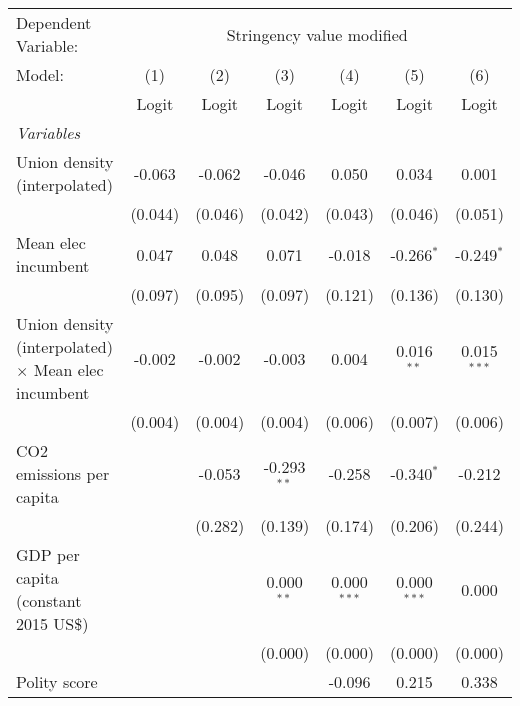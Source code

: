 
\begingroup
\centering
\begin{tabular}{lcccccc}
   \toprule
   Dependent Variable: & \multicolumn{6}{c}{Stringency value modified}\\
   Model:                                                     & (1)     & (2)     & (3)           & (4)           & (5)           & (6)\\  
                                                              &  Logit  & Logit   & Logit         & Logit         & Logit         & Logit\\  
   \midrule
   \emph{Variables}\\
   Union density (interpolated)                               & -0.063  & -0.062  & -0.046        & 0.050         & 0.034         & 0.001\\   
                                                              & (0.044) & (0.046) & (0.042)       & (0.043)       & (0.046)       & (0.051)\\   
   Mean elec incumbent                                        & 0.047   & 0.048   & 0.071         & -0.018        & -0.266$^{*}$  & -0.249$^{*}$\\   
                                                              & (0.097) & (0.095) & (0.097)       & (0.121)       & (0.136)       & (0.130)\\   
   Union density (interpolated) $\times$ Mean elec incumbent  & -0.002  & -0.002  & -0.003        & 0.004         & 0.016$^{**}$  & 0.015$^{***}$\\   
                                                              & (0.004) & (0.004) & (0.004)       & (0.006)       & (0.007)       & (0.006)\\   
   CO2 emissions per capita                                   &         & -0.053  & -0.293$^{**}$ & -0.258        & -0.340$^{*}$  & -0.212\\   
                                                              &         & (0.282) & (0.139)       & (0.174)       & (0.206)       & (0.244)\\   
   GDP per capita (constant 2015 US\$)                        &         &         & 0.000$^{**}$  & 0.000$^{***}$ & 0.000$^{***}$ & 0.000\\   
                                                              &         &         & (0.000)       & (0.000)       & (0.000)       & (0.000)\\   
   Polity score                                               &         &         &               & -0.096        & 0.215         & 0.338\\   

\end{tabular}
